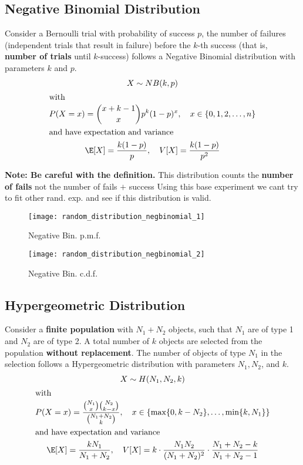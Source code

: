 \subsection{Negative Binomial Distribution} %
\label{sub:negative_binomial_distribution}

Consider a Bernoulli trial with probability of success $p$, the number of
failures (independent trials that result in failure) before the $k$-th success
(that is, \textbf{number of trials} until $k$-success) follows a Negative
Binomial distribution with parameters $k$ and $p$.
\begin{gather*}
    X \sim NB(k,p)\\
    \intertext{with}
    P(X=x) = \binom{x+k-1}{x} p^k(1-p)^x, \quad x \in \{0,1,2,\dots,n\}\\
    \intertext{and have expectation and variance}
    \E[X] = \dfrac{k(1-p)}{p}, \quad V[X] = \dfrac{k(1-p)}{p^2}
\end{gather*}

\textbf{Note: Be careful with the definition.} This distribution counts the
\textbf{number of fails} not the number of fails $+$ success
 Using this base
experiment we cant try to fit other rand. exp. and see if this distribution is
valid.
\begin{figure}[!ht]
    \begin{minipage}{0.45\linewidth}
      \texttt{[image: random\_distribution\_negbinomial\_1]}
      \caption{Negative Bin. p.m.f.}
      \label{fig:neg_bin_pmf}
    \end{minipage}
    \hfill
    \begin{minipage}{0.45\linewidth}
      \texttt{[image: random\_distribution\_negbinomial\_2]}
      \caption{Negative Bin. c.d.f.}
      \label{fig:neg_bin_cdf}
    \end{minipage}
\end{figure}

\subsection{Hypergeometric Distribution} %
\label{sub:hypergeometric_distribution}

Consider a \textbf{finite population} with $N_1+N_2$ objects, such that $N_1$
are of type 1 and $N_2$ are of type 2. A total number of $k$ objects are
selected from the population \textbf{without replacement}. The number of objects
of type $N_1$ in the selection follows a Hypergeometric distribution with
parameters $N_1, N_2$, and $k$.
\begin{gather*}
    X \sim H(N_1,N_2,k)\\
    \intertext{with}
    P(X=x) = \dfrac{\binom{N_1}{x}\binom{N_2}{k-x}}{\binom{N_1+N_2}{k}}, \quad x
    \in \{\max\{0,k-N_2\},\dots,\min\{k,N_1\} \}\\
    \intertext{and have expectation and variance}
    \E[X] = \dfrac{kN_1}{N_1+N_2}, \quad V[X] =
    k\cdot\dfrac{N_1N_2}{(N_1+N_2)^2}\cdot\dfrac{N_1+N_2-k}{N_1+N_2-1}
\end{gather*}

